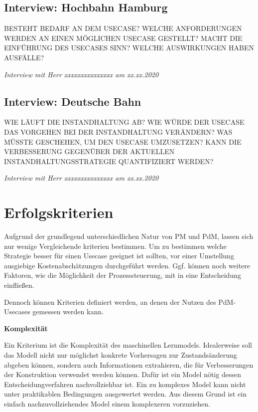 \subsection{Interview: Hochbahn Hamburg}
\label{subsec:interview_hochbahn}
BESTEHT BEDARF AN DEM USECASE? WELCHE ANFORDERUNGEN WERDEN AN EINEN MÖGLICHEN USECASE GESTELLT? MACHT DIE EINFÜHRUNG DES USECASES SINN? WELCHE AUSWIRKUNGEN HABEN AUSFÄLLE? 

\textit{Interview mit Herr xxxxxxxxxxxxxxx am xx.xx.2020}

\subsection{Interview: Deutsche Bahn}
\label{subsec:interview_deutsche_bahn}
WIE LÄUFT DIE INSTANDHALTUNG AB? WIE WÜRDE DER USECASE DAS VORGEHEN BEI DER INSTANDHALTUNG VERÄNDERN? WAS MÜSSTE GESCHEHEN, UM DEN USECASE UMZUSETZEN? KANN DIE VERBESSERUNG GEGENÜBER DER AKTUELLEN INSTANDHALTUNGSSTRATEGIE QUANTIFIZIERT WERDEN?

\textit{Interview mit Herr xxxxxxxxxxxxxxx am xx.xx.2020}

\section{Erfolgskriterien}
\label{sec:erfolgskriterien_usecase}

Aufgrund der grundlegend unterschiedlichen Natur von PM und PdM, lassen sich nur wenige Vergleichende kriterien bestimmen. Um zu bestimmen welche Strategie besser für einen Usecase geeignet ist sollten, vor einer Umstellung ausgiebige Kostenabschätzungen durchgeführt werden. Ggf. können noch weitere Faktoren, wie die Möglichkeit der Prozesssteuerung, mit in eine Entscheidung einfließen.

Dennoch können Kriterien definiert werden, an denen der Nutzen des PdM-Usecases gemessen werden kann. 

\textbf{Komplexität}

Ein Kriterium ist die Komplexität des maschinellen Lernmodels. Idealerweise soll das Modell nicht nur möglichst konkrete Vorhersagen zur Zustandsänderung abgeben können, sondern auch Informationen extrahieren, die für Verbesserungen der Konstruktion verwendet werden können. Dafür ist ein Model nötig dessen Entscheidungverfahren nachvollziehbar ist. Ein zu komplexes Model kann nicht unter praktikablen Bedingungen ausgewertet werden. Aus diesem Grund ist ein einfach nachzuvollziehendes Model einem komplexeren vorzuziehen.

